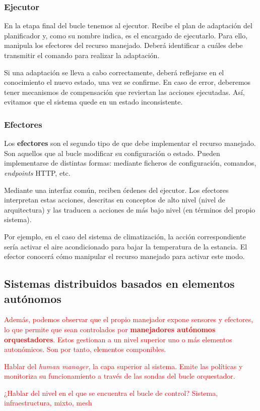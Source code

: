 \subsubsection{Ejecutor}

En la etapa final del bucle tenemos al ejecutor. Recibe el plan de adaptación del planificador y, como su nombre indica, es el encargado de ejecutarlo. Para ello, manipula los efectores del recurso manejado. Deberá identificar a cuáles debe transmitir el comando para realizar la adaptación.

Si una adaptación se lleva a cabo correctamente, deberá reflejarse en el conocimiento el nuevo estado, una vez se confirme. En caso de error, deberemos tener mecanismos de compensación que reviertan las acciones ejecutadas. Así, evitamos que el sistema quede en un estado inconsistente.

\subsubsection{Efectores}

Los \textbf{efectores} son el segundo tipo de  que debe implementar el recurso manejado. Son aquellos que al bucle modificar su configuración o estado.  Pueden implementarse de distintas formas: mediante ficheros de configuración, comandos, \emph{endpoints} HTTP, etc.

Mediante una interfaz común, reciben órdenes del ejecutor. Los efectores interpretan estas acciones, descritas en conceptos de alto nivel (nivel de arquitectura) y las traducen a acciones de más bajo nivel (en términos del propio sistema). \cite{garlanIncreasingSystemDependability2003}

Por ejemplo, en el caso del sistema de climatización, la acción correspondiente sería activar el aire acondicionado para bajar la temperatura de la estancia. El efector conocerá cómo manipular el recurso manejado para activar este modo.

\subsection{Sistemas distribuidos basados en elementos autónomos}

\textcolor{red}{Además, podemos observar que el propio manejador expone sensores y efectores, lo que permite que sean controlados por \textbf{manejadores autónomos orquestadores}. Estos gestionan a un nivel superior uno o más elementos autonómicos. Son por tanto, elementos componibles.}


\textcolor{red}{Hablar del \emph{human manager}, la capa superior al sistema. Emite las políticas y monitoriza su funcionamiento a través de las sondas del bucle orquestador.}


\textcolor{red}{¿Hablar del nivel en el que se encuentra el bucle de control? Sistema, infraestructura, mixto, mesh \cite{mendoncaGeneralityVsReusability2018}}

